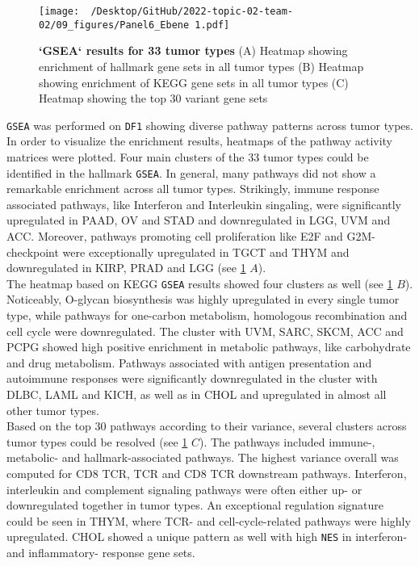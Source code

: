 \documentclass[
  parskip,
  oneside]{scrreprt}
\begin{document}
\begin{figure}[h]
  \texttt{[image: ~/Desktop/GitHub/2022-topic-02-team-02/09\_figures/Panel6\_Ebene 1.pdf]}
  \caption{\textbf{`GSEA` results for 33 tumor types} (A) Heatmap showing enrichment of hallmark gene sets in all tumor types (B) Heatmap showing enrichment of KEGG gene sets in all tumor types (C) Heatmap showing the top 30 variant gene sets}
  \label{hm}
\end{figure}

\texttt{GSEA} was performed on \texttt{DF1} showing diverse pathway
patterns across tumor types. In order to visualize the enrichment
results, heatmaps of the pathway activity matrices were plotted. Four
main clusters of the 33 tumor types could be identified in the hallmark
\texttt{GSEA}. In general, many pathways did not show a remarkable
enrichment across all tumor types. Strikingly, immune response
associated pathways, like Interferon and Interleukin singaling, were
significantly upregulated in PAAD, OV and STAD and downregulated in LGG,
UVM and ACC. Moreover, pathways promoting cell proliferation like E2F
and G2M-checkpoint were exceptionally upregulated in TGCT and THYM and
downregulated in KIRP, PRAD and LGG (see \cref{hm} \(A\)).\\
The heatmap based on KEGG \texttt{GSEA} results showed four clusters as
well (see \cref{hm} \(B\)). Noticeably, O-glycan biosynthesis was highly
upregulated in every single tumor type, while pathways for one-carbon
metabolism, homologous recombination and cell cycle were downregulated.
The cluster with UVM, SARC, SKCM, ACC and PCPG showed high positive
enrichment in metabolic pathways, like carbohydrate and drug metabolism.
Pathways associated with antigen presentation and autoimmune responses
were significantly downregulated in the cluster with DLBC, LAML and
KICH, as well as in CHOL and upregulated in almost all other tumor
types.\\
Based on the top 30 pathways according to their variance, several
clusters across tumor types could be resolved (see \cref{hm} \(C\)). The
pathways included immune-, metabolic- and hallmark-associated pathways.
The highest variance overall was computed for CD8 TCR, TCR and CD8 TCR
downstream pathways. Interferon, interleukin and complement signaling
pathways were often either up- or downregulated together in tumor types.
An exceptional regulation signature could be seen in THYM, where TCR-
and cell-cycle-related pathways were highly upregulated. CHOL showed a
unique pattern as well with high \texttt{NES} in interferon- and
inflammatory- response gene sets.
\end{document}
